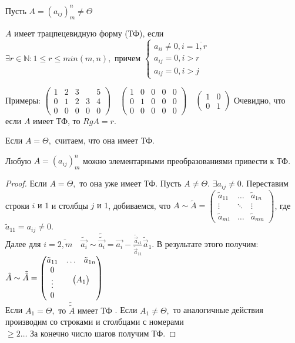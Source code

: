 \documentclass[../main.tex]{subfiles}
\begin{document}
\newpage
{}
Пусть $A=(a_{ij})_{m}^{n} \neq \Theta$
\begin{definition}
    $A$ имеет трацпецевидную форму (ТФ), если $\exists r\in\mathbb{N} : 1\leqslant r\leqslant min(m,n),\text{ причем } \begin{cases}a_{ii} \neq 0, i=\overline{1,r}\\ a_{ij}=0,i>r\\a_{ij}=0,i>j\end{cases}$
\end{definition}
\noindent Примеры: $\begin{pmatrix}
    1&2&3&&5\\ 
    0&1&2&3&4\\ 
    0&0&0&0&0
\end{pmatrix}\quad \begin{pmatrix}
     1&0&0&0&0\\ 
     0&1&0&0&0\\ 
     0&0&0&0&0
\end{pmatrix}\quad \begin{pmatrix}
     1&0\\
     0&1
\end{pmatrix}$
Очевидно, что если $A$ имеет ТФ, то $RgA=r$.
\begin{definition}
    Если $A=\Theta,$ считаем, что она имеет ТФ.
\end{definition}
\begin{theorem}
    Любую $A=(a_{ij})_{m}^{n}$ можно элементарными преобразованиями привести к ТФ.
\end{theorem}
\begin{proof}
    Если $A=\Theta,$ то она уже имеет ТФ. Пусть $A\neq\Theta.$ $\exists a_{ij}\neq 0.$ Переставим строки $i \text{ и } 1$ и столбцы $j \text{ и } 1$, добиваемся, что $A\sim\tilde{A}=\begin{pmatrix}
        \tilde{a}_{11} &\dots&\tilde{a}_{1n}\\
        \vdots&\ddots&\vdots\\ 
        \tilde{a}_{m1} &\dots&\tilde{a}_{mn}
    \end{pmatrix}$, где $\tilde{a}_{11} =a_{ij}\neq 0.$ \\ Далее для $i=\overline{2,m} \quad \tilde{\vec{a_{i}}}\sim\tilde{\tilde{\vec{a_{i}}}}=\vec{a_{i}}- \frac{\tilde{\vec{a}}_{i1}}{\tilde{\vec{a}}_{11}} \tilde{\vec{a}}_{1}$. В результате этого получим: 
    $\tilde{A} \sim \tilde{\tilde{A}}= \begin{pmatrix}
        \tilde{a}_{11}&\dots&\tilde{a}_{1n}\\
        0&\multicolumn{2}{c}{\multirow{3}{*}{$\begin{pmatrix}
            A_{1}
        \end{pmatrix}$}}\\ 
        \vdots & & \\ 
        0& 
    \end{pmatrix}$\\ Если $A_{1}=\Theta, \text{ то } \tilde{\tilde{A}} \text{ имеет ТФ }$. Если $A_{1}\neq \Theta,$ то аналогичные действия  производим со строками и столбцами с номерами $\geqslant 2 \dots \text{ За конечно число шагов получим ТФ.}$
\end{proof}
\end{document}
